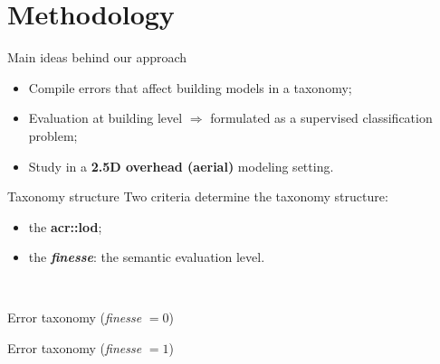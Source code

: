 \documentclass[10pt, export]{beamer}
\begin{document}
    \section{Methodology}
        \begin{frame}{Main ideas behind our approach}
            \begin{itemize}[label=$\blacktriangleright$, font=\color{IGNGreen}, itemsep=2em]
                \item<1-> Compile errors that affect building models in a taxonomy;
                \item<2-> Evaluation at building level $\Longrightarrow$ formulated as a supervised classification problem;
                \item<3-> Study in a \textbf{2.5D overhead (aerial)} modeling setting.
            \end{itemize}
        \end{frame}
        \begin{frame}{Taxonomy structure}
            Two criteria determine the taxonomy structure:
            \begin{itemize}[label=$\blacktriangleright$, font=\color{IGNGreen}, itemsep=2em]
                \item<2-> the \textbf{\acrfull{acr::lod}};
                \item<3-> the \textbf{\emph{finesse}}: the semantic evaluation level.
            \end{itemize}
            ~\\
        \end{frame}
        \begin{frame}{Error taxonomy (\textit{finesse} $= 0$)}
            \begin{figure}
                
            \end{figure}
        \end{frame}
        \begin{frame}{Error taxonomy (\textit{finesse} $= 1$)}
            \begin{figure}
                
            \end{figure}
        \end{frame}
\end{document}
